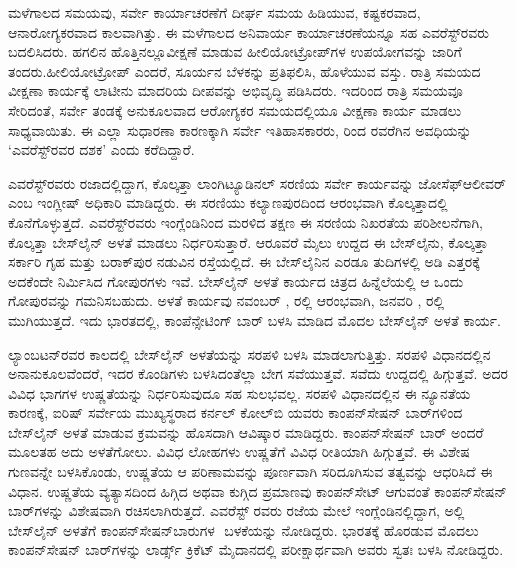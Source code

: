ಮಳೆಗಾಲದ ಸಮಯವು, ಸರ್ವೇ ಕಾರ್ಯಾಚರಣೆಗೆ ದೀರ್ಘ ಸಮಯ ಹಿಡಿಯುವ, ಕಷ್ಟಕರವಾದ, ಆನಾರೋಗ್ಯಕರವಾದ ಕಾಲವಾಗಿತ್ತು. ಈ ಮಳೆಗಾಲದ ಅನಿವಾರ್ಯ ಕಾರ್ಯಾಚರಣೆಯನ್ನೂ ಸಹ ಎವರೆಸ್ಟ್​ರವರು ಬದಲಿಸಿದರು. ಹಗಲಿನ ಹೊತ್ತಿನಲ್ಲೂ\break ವೀಕ್ಷಣೆ ಮಾಡುವ ಹೀಲಿಯೋಟ್ರೋಪ್​ಗಳ ಉಪಯೋಗವನ್ನು ಜಾರಿಗೆ ತಂದರು.\break ಹೀಲಿಯೋಟ್ರೋಪ್​ ಎಂದರೆ, ಸೂರ್ಯನ ಬೆಳಕನ್ನು ಪ್ರತಿಫಲಿಸಿ, ಹೊಳೆಯುವ ವಸ್ತು. ರಾತ್ರಿ ಸಮಯದ ವೀಕ್ಷಣಾ ಕಾರ್ಯಕ್ಕೆ ಲಾಟೀನು ಮಾದರಿಯ ದೀಪವನ್ನು ಅಭಿವೃದ್ಧಿ ಪಡಿಸಿದರು. ಇದರಿಂದ ರಾತ್ರಿ ಸಮಯವೂ ಸೇರಿದಂತೆ, ಸರ್ವೇ ತಂಡಕ್ಕೆ ಅನುಕೂಲವಾದ ಆರೋಗ್ಯಕರ ಸಮಯದಲ್ಲಿಯೂ ವೀಕ್ಷಣಾ ಕಾರ್ಯ ಮಾಡಲು ಸಾಧ್ಯವಾಯಿತು. ಈ ಎಲ್ಲಾ ಸುಧಾರಣಾ ಕಾರಣಕ್ಕಾಗಿ ಸರ್ವೇ ಇತಿಹಾಸಕಾರರು,  ರಿಂದ  ರವರೆಗಿನ ಅವಧಿಯನ್ನು ‘ಎವರೆಸ್ಟ್​ರವರ ದಶಕ’ ಎಂದು ಕರೆದಿದ್ದಾರೆ.

ಎವರೆಸ್ಟ್​ರವರು ರಜಾದಲ್ಲಿದ್ದಾಗ, ಕೊಲ್ಕತ್ತಾ ಲಾಂಗಿಟ್ಯೂಡಿನಲ್​ ಸರಣಿಯ ಸರ್ವೇ ಕಾರ್ಯವನ್ನು ಜೋಸೆಫ್​ ಆಲೀವರ್​ ಎಂಬ ಇಂಗ್ಲೀಷ್​ ಅಧಿಕಾರಿ ಮಾಡಿದ್ದರು. ಈ ಸರಣಿಯು ಕಲ್ಯಾಣಪುರದಿಂದ ಆರಂಭವಾಗಿ ಕೊಲ್ಕತ್ತಾದಲ್ಲಿ ಕೊನೆಗೊಳ್ಳುತ್ತದೆ. ಎವರೆಸ್ಟ್​ರವರು ಇಂಗ್ಲೆಂಡಿನಿಂದ ಮರಳಿದ ತಕ್ಷಣ ಈ ಸರಣಿಯ ನಿಖರತೆಯ ಪರಿಶೀಲನೆಗಾಗಿ, ಕೊಲ್ಕತ್ತಾ ಬೇಸ್‌ಲೈನ್​ ಅಳತೆ ಮಾಡಲು ನಿರ್ಧರಿಸುತ್ತಾರೆ. ಆರೂವರೆ ಮೈಲು ಉದ್ದದ ಈ ಬೇಸ್​ಲೈನು, ಕೊಲ್ಕತ್ತಾ ಸರ್ಕಾರಿ ಗೃಹ ಮತ್ತು ಬರಾಕ್​ಪುರ ನಡುವಿನ ರಸ್ತೆಯಲ್ಲಿದೆ. ಈ ಬೇಸ್​ಲೈನಿನ ಎರಡೂ ತುದಿಗಳಲ್ಲಿ  ಅಡಿ ಎತ್ತರಕ್ಕೆ ಅದಕೆಂದೇ ನಿರ್ಮಿಸಿದ ಗೋಪುರಗಳು ಇವೆ. ಬೇಸ್‌ಲೈನ್ ಅಳತೆ ಕಾರ್ಯದ ಚಿತ್ರದ ಹಿನ್ನೆಲೆಯಲ್ಲಿ ಆ ಒಂದು ಗೋಪುರವನ್ನು ಗಮನಿಸಬಹುದು. ಅಳತೆ ಕಾರ್ಯವು ನವಂಬರ್​ ,  ರಲ್ಲಿ ಆರಂಭವಾಗಿ, ಜನವರಿ ,  ರಲ್ಲಿ ಮುಗಿಯುತ್ತದೆ. ಇದು ಭಾರತದಲ್ಲಿ, ಕಾಂಪೆನ್ಸೇಟಿಂಗ್​ ಬಾರ್​ ಬಳಸಿ ಮಾಡಿದ ಮೊದಲ ಬೇಸ್‌ಲೈನ್​ ಅಳತೆ ಕಾರ್ಯ.

ಲ್ಯಾಂಬಟನ್​ರವರ ಕಾಲದಲ್ಲಿ ಬೇಸ್‌ಲೈನ್​ ಅಳತೆಯನ್ನು ಸರಪಳಿ ಬಳಸಿ ಮಾಡಲಾಗುತ್ತಿತ್ತು. ಸರಪಳಿ ವಿಧಾನದಲ್ಲಿನ ಅನಾನುಕೂಲವೆಂದರೆ, ಇದರ ಕೊಂಡಿಗಳು ಬಳಸಿದಂತೆಲ್ಲಾ ಬೇಗ ಸವೆಯುತ್ತವೆ. ಸವೆದು ಉದ್ದದಲ್ಲಿ ಹಿಗ್ಗುತ್ತವೆ. ಅದರ ವಿವಿಧ ಭಾಗಗಳ ಉಷ್ಣತೆಯನ್ನು ನಿರ್ಧರಿಸುವುದೂ ಸಹ ಸುಲಭವಲ್ಲ. ಸರಪಳಿ ವಿಧಾನದಲ್ಲಿನ ಈ ನ್ಯೂನತೆಯ ಕಾರಣಕ್ಕೆ, ಐರಿಷ್​ ಸರ್ವೇಯ ಮುಖ್ಯಸ್ಥರಾದ ಕರ್ನಲ್​ ಕೋಲ್​ಬಿ ಯವರು ಕಾಂಪನ್​ಸೇಷನ್​ ಬಾರ್​ಗಳಿಂದ ಬೇಸ್‌ಲೈನ್​ ಅಳತೆ ಮಾಡುವ ಕ್ರಮವನ್ನು ಹೊಸದಾಗಿ ಆವಿಷ್ಕಾರ ಮಾಡಿದ್ದರು. ಕಾಂಪನ್​ಸೇಷನ್​ ಬಾರ್​ ಅಂದರೆ ಮೂಲತಹ ಅದು ಅಳತೆಗೋಲು. ವಿವಿಧ ಲೋಹಗಳು ಉಷ್ಣತೆಗೆ ವಿವಿಧ ರೀತಿಯಾಗಿ ಹಿಗ್ಗುತ್ತವೆ. ಈ ವಿಶೇಷ ಗುಣವನ್ನೇ ಬಳಸಿಕೊಂಡು, ಉಷ್ಣತೆಯ ಆ ಪರಿಣಾಮವನ್ನು ಪೂರ್ಣವಾಗಿ ಸರಿದೂಗಿಸುವ ತತ್ವವನ್ನು ಆಧರಿಸಿದೆ ಈ ವಿಧಾನ. ಉಷ್ಣತೆಯ ವ್ಯತ್ಯಾಸದಿಂದ ಹಿಗ್ಗಿದ ಅಥವಾ ಕುಗ್ಗಿದ ಪ್ರಮಾಣವು ಕಾಂಪನ್​ಸೇಟ್​ ಆಗುವಂತೆ ಕಾಂಪನ್​ಸೇಷನ್​ ಬಾರ್​ಗಳನ್ನು ವಿಶೇಷವಾಗಿ ರಚಿಸಲಾಗಿರುತ್ತದೆ. ಎವರೆಸ್ಟ್​ ರವರು ರಜೆಯ ಮೇಲೆ ಇಂಗ್ಲೆಂಡಿನಲ್ಲಿದ್ದಾಗ, ಅಲ್ಲಿ ಬೇಸ್‌ಲೈನ್​ ಅಳತೆಗೆ ಕಾಂಪನ್​ಸೇಷನ್​ ಬಾರುಗಳ ​ ಬಳಕೆಯನ್ನು ನೋಡಿದ್ದರು. ಭಾರತಕ್ಕೆ ಹೊರಡುವ ಮೊದಲು ಕಾಂಪನ್​ಸೇಷನ್​ ಬಾರ್​ಗಳನ್ನು ಲಾರ್ಡ್ಸ್ ಕ್ರಿಕೆಟ್​ ಮೈದಾನದಲ್ಲಿ ಪರೀಕ್ಷಾರ್ಥವಾಗಿ ಅವರು ಸ್ವತಃ ಬಳಸಿ ನೋಡಿದ್ದರು.

